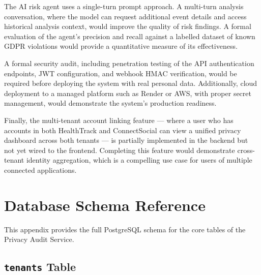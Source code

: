 \documentclass[a4paper,12pt,onecolumn]{report}
\begin{document}
The AI risk agent uses a single-turn prompt approach.
A multi-turn analysis conversation, where the model can request additional event details and access historical analysis context, would improve the quality of risk findings.
A formal evaluation of the agent's precision and recall against a labelled dataset of known GDPR violations would provide a quantitative measure of its effectiveness.

A formal security audit, including penetration testing of the API authentication endpoints, JWT configuration, and webhook HMAC verification, would be required before deploying the system with real personal data.
Additionally, cloud deployment to a managed platform such as Render or AWS, with proper secret management, would demonstrate the system's production readiness.

Finally, the multi-tenant account linking feature --- where a user who has accounts in both HealthTrack and ConnectSocial can view a unified privacy dashboard across both tenants --- is partially implemented in the backend but not yet wired to the frontend.
Completing this feature would demonstrate cross-tenant identity aggregation, which is a compelling use case for users of multiple connected applications.






\appendix

\chapter{Database Schema Reference}

This appendix provides the full PostgreSQL schema for the core tables of the Privacy Audit Service.

\section{\texttt{tenants} Table}
\end{document}
